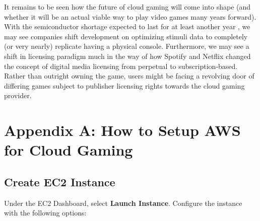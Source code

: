 \documentclass[titlepage, 12pt]{article}
\begin{document}
	It remains to be seen how the future of cloud gaming will come into shape (and whether it will be an actual viable way to play video games many years forward). With the semiconductor shortage expected to last for at least another year \citep{verge}, we may see companies shift development on optimizing stimuli data to completely (or very nearly) replicate having a physical console. Furthermore, we may see a shift in licensing paradigm much in the way of how Spotify and Netflix changed the concept of digital media licensing from perpetual to subscription-based. Rather than outright owning the game, users might be facing a revolving door of differing games subject to publisher licensing rights towards the cloud gaming provider.

\newpage



\newpage
\section{Appendix A: How to Setup AWS for Cloud Gaming}

	\subsection*{Create EC2 Instance}

	Under the EC2 Dashboard, select \textbf{Launch Instance}. Configure the instance with the following options:
\end{document}
